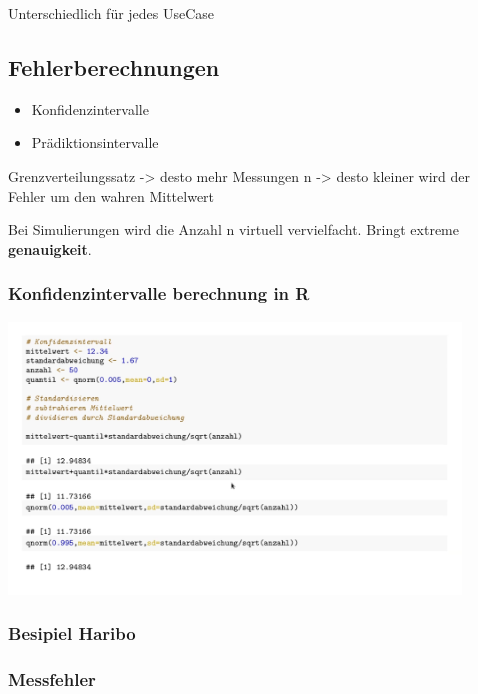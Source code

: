 \documentclass[
]{article}
\providecommand{\tightlist}{%
  \setlength{\itemsep}{0pt}\setlength{\parskip}{0pt}}
\begin{document}
Unterschiedlich für jedes UseCase

\hypertarget{fehlerberechnungen}{%
\subsection{Fehlerberechnungen}\label{fehlerberechnungen}}

\begin{itemize}
\tightlist
\item
  Konfidenzintervalle
\item
  Prädiktionsintervalle
\end{itemize}

Grenzverteilungssatz -\textgreater{} desto mehr Messungen n
-\textgreater{} desto kleiner wird der Fehler um den wahren Mittelwert

Bei Simulierungen wird die Anzahl n virtuell vervielfacht. Bringt
extreme \textbf{genauigkeit}.

\hypertarget{konfidenzintervalle-berechnung-in-r}{%
\subsubsection{Konfidenzintervalle berechnung in
R}\label{konfidenzintervalle-berechnung-in-r}}

\includegraphics[width=12cm, center]{Fig12}

\hypertarget{besipiel-haribo}{%
\subsubsection{Besipiel Haribo}\label{besipiel-haribo}}

\hypertarget{messfehler}{%
\subsubsection{Messfehler}\label{messfehler}}
\end{document}
